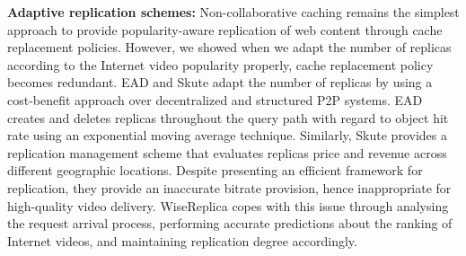 \noindent
\textbf{Adaptive replication schemes:} Non-collaborative caching remains the simplest approach to provide popularity-aware replication of web content through cache replacement policies\cite{popularity_awaregreedydual_size_icdcs99}. However, we showed when we adapt the number of replicas according to the Internet video popularity properly, cache replacement policy becomes redundant. EAD \cite{Haiying_Shen_P2P_2010}
and Skute \cite{self_tolerant_acm_cloud_2010} adapt the number of replicas by
using a cost-benefit approach over decentralized and structured P2P
systems. EAD creates and deletes replicas throughout the query path
with regard to object hit rate using an exponential moving average
technique. Similarly, Skute provides a replication management scheme that
evaluates replicas price and revenue across different geographic
locations. Despite presenting an
efficient framework for replication, they provide an inaccurate bitrate provision, hence
inappropriate for high-quality video delivery. WiseReplica copes with this issue through analysing the request arrival process, performing accurate predictions about the ranking of Internet videos, and maintaining replication degree accordingly.

